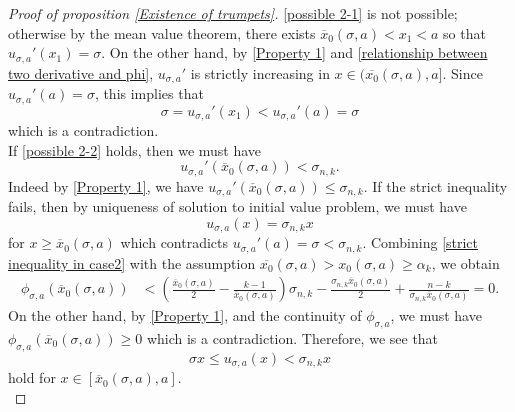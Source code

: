 \documentclass[pdflatex,sn-mathphys-num]{sn-jnl}
\begin{document}
\begin{proof}[Proof of proposition \ref{Existence of trumpets}]
      \eqref{possible 2-1} is not possible; otherwise by the mean value theorem, there exists $\overline{x}_0(\sigma, a) < x_1 < a$ so that $u_{\sigma, a}'(x_1) = \sigma$. On the other hand, by \eqref{Property 1} and \eqref{relationship between two derivative and phi}, $u_{\sigma, a}'$ is strictly increasing in $x \in (\overline{x_0}(\sigma, a), a]$. Since $u_{\sigma, a}'(a) = \sigma$, this implies that
      \begin{equation}
          \sigma = u_{\sigma, a}'(x_1) < u_{\sigma, a}'(a) = \sigma
      \end{equation}
      which is a contradiction.\\
      
      If \eqref{possible 2-2} holds, then we must have
      \begin{equation}\label{strict inequality in case2}
          u_{\sigma, a}'(\overline{x}_0(\sigma, a)) < \sigma_{n,k}.
      \end{equation}
     Indeed by \eqref{Property 1}, we have $u_{\sigma, a}'(\overline{x}_0(\sigma, a)) \leq \sigma_{n,k}$. If the strict inequality fails, then by uniqueness of solution to initial value problem, we must have
     \begin{equation}
         u_{\sigma, a}(x) = \sigma_{n,k}x
     \end{equation}
     for $x \geq \overline{x}_0(\sigma, a)$ which contradicts $u_{\sigma,a}'(a) = \sigma < \sigma_{n,k}$. Combining \eqref{strict inequality in case2} with the assumption $\overline{x_0}(\sigma, a) > x_0(\sigma, a) \geq  \alpha_k$, we obtain
\begin{align*}
     \phi_{\sigma, a}(\overline{x}_0(\sigma, a)) &< (\frac{\overline{x}_0(\sigma, a)}{2} - \frac{k-1}{\overline{x}_0(\sigma, a)})\sigma_{n,k} - \frac{\sigma_{n,k}\overline{x}_0(\sigma, a)}{2} + \frac{n-k}{\sigma_{n,k}\overline{x}_0(\sigma, a)} = 0.
\end{align*}
    On the other hand, by \eqref{Property 1}, and the continuity of $\phi_{\sigma, a}$, we must have $\phi_{\sigma, a}(\overline{x}_0(\sigma, a))\geq 0$ which is a contradiction. Therefore, we see that
    \begin{equation}\label{weak C^0 for trumpet}
        \sigma x \leq u_{\sigma, a}(x) < \sigma_{n,k}x
    \end{equation}
    hold for $x \in [ \overline{x}_0(\sigma, a), a]$.\\
    

\end{proof}
\end{document}
